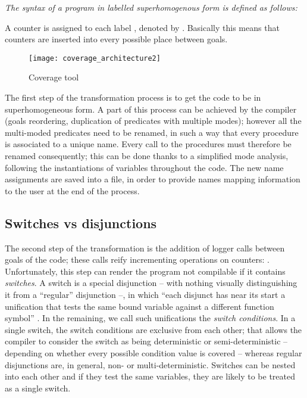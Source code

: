 \documentclass[british]{llncs}
\begin{document}
\medskip{}

\begin{definition}
\noindent \textit{The syntax of a program in labelled superhomogenous
form is defined as follows:}

{\small 
 }{\small \par}
\end{definition}

A counter is assigned to each label , denoted by .
Basically this means that counters are inserted into every possible
place between goals.

\begin{figure}[h]
\begin{centering}
\texttt{[image: coverage\_architecture2]}
\par\end{centering}

\caption{\label{fig:Coverage-tool}Coverage tool}

\end{figure}




The first step of the transformation process is to get
the code to be in superhomogeneous form. A part of this process can be achieved by the compiler (goals reordering, duplication of predicates with multiple modes); however all the multi-moded predicates need to be renamed, in such a way that every procedure is associated to
a unique name. Every call to the procedures must therefore be renamed consequently; this
can be done thanks to a simplified mode analysis, following the instantiations
of variables throughout the code. The new name assignments are saved
into a file, in order to provide names mapping information to the user at the end of the process.


\subsection{Switches vs disjunctions}

The second step of the transformation is the addition of logger calls between goals of the code; these calls reify incrementing operations on counters: .
Unfortunately, this step can render the program not compilable if it
contains \emph{switches}. A switch is a special disjunction -- with nothing visually distinguishing it from a ``regular'' disjunction --, in which {}``each
disjunct has near its start a unification that tests the same bound
variable against a different function symbol'' \cite{Mercury:reference_manual}. In the remaining, we call such unifications the \emph{switch conditions}.
In a single switch, the switch conditions are exclusive from each other;
that allows the compiler to consider the switch as being deterministic or semi-deterministic -- depending on whether every possible
condition value is covered -- whereas regular disjunctions are, in general, non- or multi-deterministic. Switches can be nested into each other
and if they test the same variables, they are likely to be treated
as a single switch. 
\end{document}
